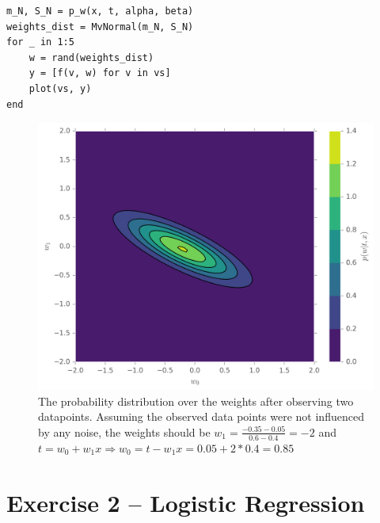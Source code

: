 \documentclass{article}
\begin{document}
\begin{enumerate}
\begin{lstlisting}
m_N, S_N = p_w(x, t, alpha, beta)
weights_dist = MvNormal(m_N, S_N)
for _ in 1:5
    w = rand(weights_dist)
    y = [f(v, w) for v in vs]
    plot(vs, y)
end
\end{lstlisting}
\begin{figure}[H]
\centering
\includegraphics[width=.6\linewidth]{images/pw.png}
\caption{The probability distribution over the weights after observing two datapoints. Assuming the observed data points were not influenced by any noise, the weights should be $w_1=\frac{-0.35 - 0.05}{0.6 - 0.4}=-2$ and $t=w_0+w_1x \Rightarrow w_0=t-w_1x=0.05+2*0.4= 0.85$}
\label{fig:pw}
\end{figure}
\end{enumerate}

\section*{Exercise 2 -- Logistic Regression}
\end{document}

